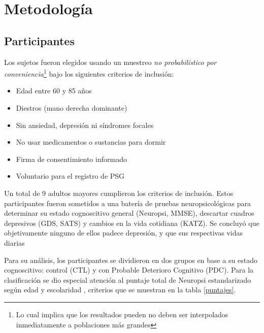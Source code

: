 \chapter{Metodología}


\section{Participantes}

Los sujetos fueron elegidos usando un muestreo \textit{no probabilístico por 
conveniencia}\footnote{Lo cual implica que los resultados pueden no deben ser interpolados 
inmediatamente a poblaciones más grandes} bajo los siguientes criterios de inclusión:
\begin{itemize}
\item Edad entre 60 y 85 años
\item Diestros (mano derecha dominante)
\item Sin ansiedad, depresión ni síndromes focales
\item No usar medicamentos o sustancias para dormir
\item Firma de consentimiento informado
\item Voluntario para el registro de PSG
\end{itemize}

Un total de 9 adultos mayores cumplieron los criterios de inclusión. Estos participantes fueron 
sometidos a una batería de pruebas neuropsicológicas para determinar su estado cognoscitivo general 
(Neuropsi, MMSE), descartar cuadros depresivos (GDS, SATS) y cambios en la vida cotidiana (KATZ).
Se concluyó que objetivamente ninguno de ellos padece depresión, y que sus respectivas vidas diarias

Para su análisis, los participantes se dividieron en dos grupos en base a su estado cognoscitivo:
control (CTL) y con Probable Deterioro Cognitivo (PDC). Para la clasificación se dio especial 
atención al puntaje total de Neuropsi estandarizado según edad y escolaridad \cite{Ardila12}, 
criterios que se muestran en la tabla \ref{puntajes}.

